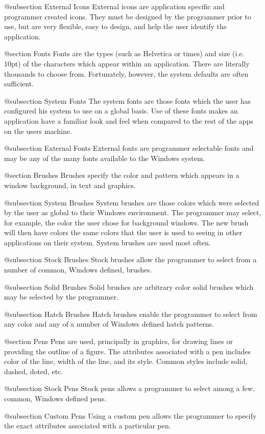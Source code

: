 @subsection External Icons
External icons are application specific and programmer created icons.
They must be designed by the programmer prior to use, but are very
flexible, easy to design, and help the user identify the application.

@section Fonts
Fonts are the types (such as Helvetica or times) and size (i.e. 10pt)
of the characters which appear within an application.  There are
literally thousands to choose from.  Fortunately, however, the system
defaults are often sufficient.

@subsection System Fonts
The system fonts are those fonts which the user has configured his
system to use on a global basis.  Use of these fonts makes an
application have a familiar look and feel when compared to the rest of
the apps on the users machine.

@subsection External Fonts
External fonts are programmer selectable fonts and may be any of the
many fonts available to the Windows system.

@section Brushes
Brushes specify the color and pattern which appears in a window background,
in text and graphics.

@subsection System Brushes
System brushes are those colors which were selected by the user as
global to their Windows environment.  The programmer may select, for
example, the color the user chose for background windows.  The
new brush will then have colors the same colors that the user is used
to seeing in other applications on their system.  System brushes are
used most often.

@subsection Stock Brushes
Stock brushes allow the programmer to select from a number of common,
Windows defined, brushes.

@subsection Solid Brushes
Solid brushes are arbitrary color solid brushes which may be selected
by the programmer.

@subsection Hatch Brushes
Hatch brushes enable the programmer to select from any color and any of
a number of Windows defined hatch patterns.

@section Pens
Pens are used, principally in graphics, for drawing lines or providing
the outline of a figure.  The attributes associated with a pen includes
color of the line, width of the line, and its style.  Common styles
include solid, dashed, doted, etc.

@subsection Stock Pens
Stock pens allows a programmer to select among a few, common, Windows
defined pens.

@subsection Custom Pens
Using a custom pen allows the programmer to specify the exact attributes
associated with a particular pen.

